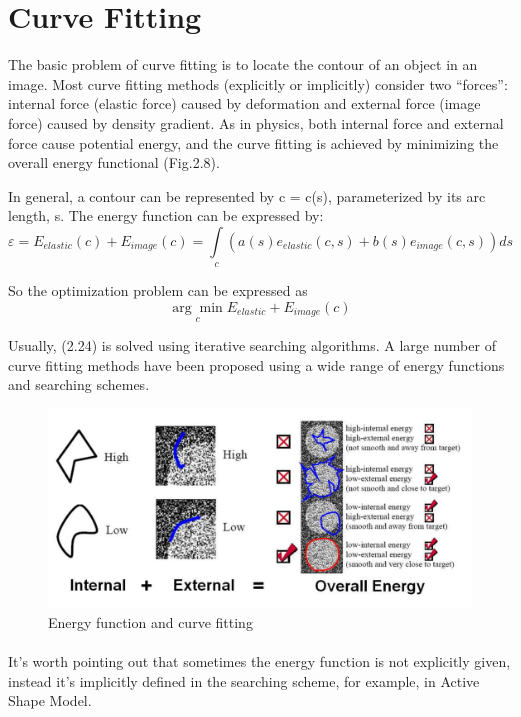 \documentclass[12pt, twoside]{report}
\begin{document}
		\section{Curve Fitting}
		The basic problem of curve fitting is to locate the contour of an object in an image. Most
		curve fitting methods (explicitly or implicitly) consider two “forces”: internal force (elastic
		force) caused by deformation and external force (image force) caused by density gradient.
		As in physics, both internal force and external force cause potential energy, and the curve
		fitting is achieved by minimizing the overall energy functional (Fig.2.8).
		
		In general, a contour can be represented by c = c(s), parameterized by its arc length,
		s. The energy function can be expressed by:
		\begin{equation}
			\varepsilon = E_{elastic}(c) + E_{image}(c) = \int\limits_c (a(s)e_{elastic}(c,s) + b(s)e_{image}(c,s))ds
		\end{equation}
		
		So the optimization problem can be expressed as
		\begin{equation}
			\underset{c}{\arg\min}E_{elastic} + E_{image}(c)
		\end{equation}
		
		Usually, (2.24) is solved using iterative searching algorithms. A large number of curve
		fitting methods have been proposed using a wide range of energy functions and searching
		schemes.
	\newpage
	
	\begin{figure}[h!]
		\centering
	\includegraphics[width=\textwidth]{img/18_1.png}     
		\caption{Energy function and curve fitting}
		\label{fig:face}
	\end{figure}

	\paragraph{}
	It’s worth pointing out that sometimes the energy function is not explicitly given,
	instead it’s implicitly defined in the searching scheme, for example, in Active Shape Model.
\end{document}
